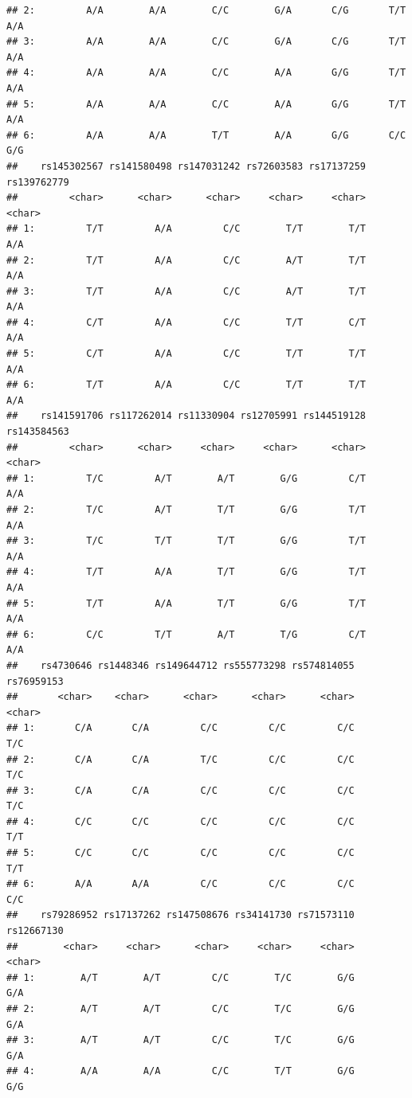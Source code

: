 \documentclass[
]{article}
\begin{document}
\begin{verbatim}
## 2:         A/A        A/A        C/C        G/A       C/G       T/T       A/A
## 3:         A/A        A/A        C/C        G/A       C/G       T/T       A/A
## 4:         A/A        A/A        C/C        A/A       G/G       T/T       A/A
## 5:         A/A        A/A        C/C        A/A       G/G       T/T       A/A
## 6:         A/A        A/A        T/T        A/A       G/G       C/C       G/G
##    rs145302567 rs141580498 rs147031242 rs72603583 rs17137259 rs139762779
##         <char>      <char>      <char>     <char>     <char>      <char>
## 1:         T/T         A/A         C/C        T/T        T/T         A/A
## 2:         T/T         A/A         C/C        A/T        T/T         A/A
## 3:         T/T         A/A         C/C        A/T        T/T         A/A
## 4:         C/T         A/A         C/C        T/T        C/T         A/A
## 5:         C/T         A/A         C/C        T/T        T/T         A/A
## 6:         T/T         A/A         C/C        T/T        T/T         A/A
##    rs141591706 rs117262014 rs11330904 rs12705991 rs144519128 rs143584563
##         <char>      <char>     <char>     <char>      <char>      <char>
## 1:         T/C         A/T        A/T        G/G         C/T         A/A
## 2:         T/C         A/T        T/T        G/G         T/T         A/A
## 3:         T/C         T/T        T/T        G/G         T/T         A/A
## 4:         T/T         A/A        T/T        G/G         T/T         A/A
## 5:         T/T         A/A        T/T        G/G         T/T         A/A
## 6:         C/C         T/T        A/T        T/G         C/T         A/A
##    rs4730646 rs1448346 rs149644712 rs555773298 rs574814055 rs76959153
##       <char>    <char>      <char>      <char>      <char>     <char>
## 1:       C/A       C/A         C/C         C/C         C/C        T/C
## 2:       C/A       C/A         T/C         C/C         C/C        T/C
## 3:       C/A       C/A         C/C         C/C         C/C        T/C
## 4:       C/C       C/C         C/C         C/C         C/C        T/T
## 5:       C/C       C/C         C/C         C/C         C/C        T/T
## 6:       A/A       A/A         C/C         C/C         C/C        C/C
##    rs79286952 rs17137262 rs147508676 rs34141730 rs71573110 rs12667130
##        <char>     <char>      <char>     <char>     <char>     <char>
## 1:        A/T        A/T         C/C        T/C        G/G        G/A
## 2:        A/T        A/T         C/C        T/C        G/G        G/A
## 3:        A/T        A/T         C/C        T/C        G/G        G/A
## 4:        A/A        A/A         C/C        T/T        G/G        G/G

\end{verbatim}
\end{document}
